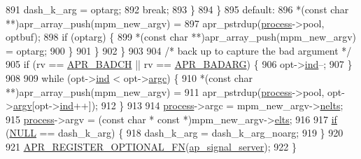\begin{DoxyCode}
891                     dash\_k\_arg = optarg;
892                     \textcolor{keywordflow}{break};
893                 \}
894             \}
895         \textcolor{keywordflow}{default}:
896             *(\textcolor{keyword}{const} \textcolor{keywordtype}{char} **)apr\_array\_push(mpm\_new\_argv) =
897                 apr\_pstrdup(\hyperlink{pcretest_8txt_a8ec73ad58a04604170bd96796a2075a8}{process}->pool, optbuf);
898             \textcolor{keywordflow}{if} (optarg) \{
899                 *(\textcolor{keyword}{const} \textcolor{keywordtype}{char} **)apr\_array\_push(mpm\_new\_argv) = optarg;
900             \}
901         \}
902     \}
903 
904     \textcolor{comment}{/* back up to capture the bad argument */}
905     \textcolor{keywordflow}{if} (rv == \hyperlink{group__APR__Error_ga6f3ca71069880d9fe5678687a257d616}{APR\_BADCH} || rv == \hyperlink{group__APR__Error_ga771bf48ab38d93355be8530f6efe4ae9}{APR\_BADARG}) \{
906         opt->\hyperlink{structapr__getopt__t_ab04d49d670f095c3244dc9792b70ff07}{ind}--;
907     \}
908 
909     \textcolor{keywordflow}{while} (opt->\hyperlink{structapr__getopt__t_ab04d49d670f095c3244dc9792b70ff07}{ind} < opt->\hyperlink{structapr__getopt__t_a58aeb33137aabdd5a00efbde05652094}{argc}) \{
910         *(\textcolor{keyword}{const} \textcolor{keywordtype}{char} **)apr\_array\_push(mpm\_new\_argv) =
911             apr\_pstrdup(\hyperlink{pcretest_8txt_a8ec73ad58a04604170bd96796a2075a8}{process}->pool, opt->\hyperlink{structapr__getopt__t_a296c27d8db2fe6d4b88c5c7a85c40c02}{argv}[opt->\hyperlink{structapr__getopt__t_ab04d49d670f095c3244dc9792b70ff07}{ind}++]);
912     \}
913 
914     \hyperlink{pcretest_8txt_a8ec73ad58a04604170bd96796a2075a8}{process}->argc = mpm\_new\_argv->\hyperlink{structapr__array__header__t_ab11b88220885c5a0920a06ac85680055}{nelts};
915     \hyperlink{pcretest_8txt_a8ec73ad58a04604170bd96796a2075a8}{process}->argv = (\textcolor{keyword}{const} \textcolor{keywordtype}{char} * \textcolor{keyword}{const} *)mpm\_new\_argv->\hyperlink{structapr__array__header__t_af8462fa2a1ddf6406c66cd3dd441a269}{elts};
916 
917     \hyperlink{util__expr__scan_8c_a33e91cd0cef6786e9e3a27ac67707207}{if} (\hyperlink{pcre_8txt_ad7f989d16aa8ca809a36bc392c07fba1}{NULL} == dash\_k\_arg) \{
918         dash\_k\_arg = dash\_k\_arg\_noarg;
919     \}
920 
921     \hyperlink{group__APR__Util__Opt_gab611deabd6e78b5f666071e8cbdcc736}{APR\_REGISTER\_OPTIONAL\_FN}(\hyperlink{group__APACHE__MPM_ga7d5ef13c9a1669642b422bcac870aac3}{ap\_signal\_server});
922 \}
\end{DoxyCode}


